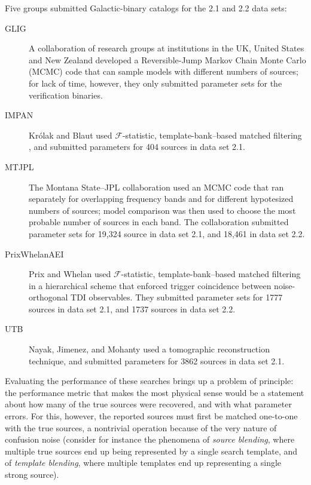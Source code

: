 \documentclass{iopart}
\begin{document}
Five groups submitted Galactic-binary catalogs for the 2.1 and 2.2 data sets:
%
\begin{description}
\item[GLIG] A collaboration of research groups at institutions in the UK, United States and New Zealand developed a Reversible-Jump Markov Chain Monte Carlo (MCMC) code that can sample models with different numbers of sources; for lack of time, however, they only submitted parameter sets for the verification binaries.
\item[IMPAN] Kr\'olak and Blaut used $\mathcal{F}$-statistic, template-bank--based matched filtering \cite{JKS98,KTV04}, and submitted parameters for 404 sources in data set 2.1.
\item[MTJPL] The Montana State--JPL collaboration used an MCMC code that ran separately for overlapping frequency bands and for different hypotesized numbers of sources; model comparison was then used to choose the most probable number of sources in each band. The collaboration submitted parameter sets for 19,324 source in data set 2.1, and 18,461 in data set 2.2.
\item[PrixWhelanAEI] Prix and Whelan used $\mathcal{F}$-statistic, template-bank--based matched filtering in a hierarchical scheme that enforced trigger coincidence between noise-orthogonal TDI observables. They submitted parameter sets for 1777 sources in data set 2.1, and 1737 sources in data set 2.2.
\item[UTB] Nayak, Jimenez, and Mohanty used a tomographic reconstruction technique, and submitted parameters for 3862 sources in data set 2.1.
\end{description}
%
Evaluating the performance of these searches brings up a problem of principle: the performance metric that makes the most physical sense would be a statement about how many of the true sources were recovered, and with what parameter errors. For this, however, the reported sources must first be matched one-to-one with the true sources, a nontrivial operation because of the very nature of confusion noise (consider for instance the phenomena of \emph{source blending}, where multiple true sources end up being represented by a single search template, and of \emph{template blending}, where multiple templates end up representing a single strong source).
%
\end{document}
